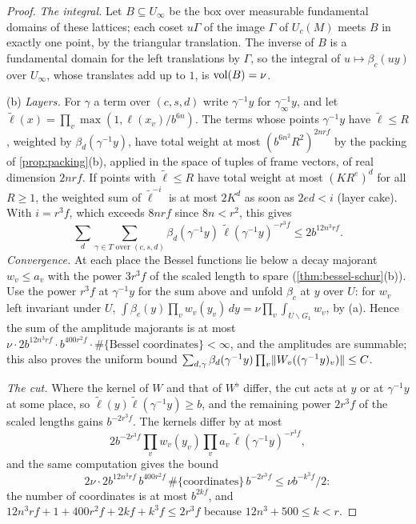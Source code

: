 \begin{proof}
\emph{The integral.} Let $B\subseteq U_\infty$ be the box over measurable fundamental domains of these lattices; each coset $u\Gamma$ of the image $\Gamma$ of $U_c(M)$ meets $B$ in exactly one point, by the triangular translation. The inverse of $B$ is a
fundamental domain for the left translations by $\Gamma$, so the integral of $u\mapsto\beta_c(uy)$ over $U_\infty$, whose translates add up to $1$, is $\operatorname{vol}(B)=\nu$.

(b) \emph{Layers.} For $\gamma$ a term over $(c,s,d)$ write $\gamma^{-1}y$ for $\gamma_\infty^{-1}y$, and let $\tilde\ell(x)=\prod_v\max(1,\ell(x_v)/b^{6n})$. The terms whose points $\gamma^{-1}y$ have $\tilde\ell\le R$, weighted by $\beta_d(\gamma^{-1}y)$, have total weight at most
$(b^{6n^2}R^2)^{2nrf}$ by the packing of \cref{prop:packing}(b), applied in the space of tuples of frame vectors, of real dimension $2nrf$. If points with $\tilde\ell\le R$ have total weight at most $(KR^e)^d$ for all $R\ge1$, the weighted sum of $\tilde\ell^{-i}$ is at
most $2K^d$ as soon as $2ed<i$ (layer cake). With $i=r^3f$, which exceeds $8nrf$ since $8n<r^2$, this gives
\[
  \sum_d\sum_{\gamma\in T\text{ over }(c,s,d)}\beta_d(\gamma^{-1}y)\,\tilde\ell(\gamma^{-1}y)^{-r^3f}\le2b^{12n^3rf}.
\]
\emph{Convergence.} At each place the Bessel functions lie below a decay majorant $w_v\le a_v$ with the power $3r^3f$ of the scaled length to spare (\cref{thm:bessel-schur}(b)). Use the power $r^3f$ at $\gamma^{-1}y$ for the sum above and unfold $\beta_c$ at $y$
over $U$: for $w_v$ left invariant under $U$, $\int\beta_c(y)\prod_vw_v(y_v)\,dy=\nu\prod_v\int_{U\backslash G_1}w_v$, by (a). Hence the sum of the amplitude majorants is at most $\nu\cdot2b^{12n^3rf}\cdot b^{400r^2f}\cdot\#\{\text{Bessel coordinates}\}<\infty$, and the
amplitudes are summable; this also proves the uniform bound $\sum_{d,\gamma}\beta_d(\gamma^{-1}y)\prod_v\lVert W_v((\gamma^{-1}y)_v)\rVert\le C$.

\emph{The cut.} Where the kernel of $W$ and that of $W^\flat$ differ, the cut acts at $y$ or at $\gamma^{-1}y$ at some place, so $\tilde\ell(y)\tilde\ell(\gamma^{-1}y)\ge b$, and the remaining power $2r^3f$ of the scaled lengths gains $b^{-2r^3f}$. The kernels differ by at most
\[
  2b^{-2r^3f}\prod_vw_v(y_v)\prod_va_v\,\tilde\ell(\gamma^{-1}y)^{-r^3f},
\]
and the same computation gives the bound
\[
  2\nu\cdot2b^{12n^3rf}\,b^{400r^2f}\,\#\{\text{coordinates}\}\,b^{-2r^3f}\le\nu b^{-k^3f}/2:
\]
the number of coordinates is at most $b^{2kf}$, and $12n^3rf+1+400r^2f+2kf+k^3f\le2r^3f$ because $12n^3+500\le k<r$.


\end{proof}
